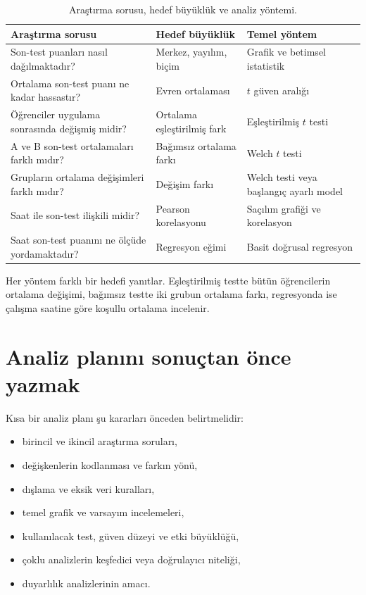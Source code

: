 \begin{table}[htbp]
\centering
\caption{Araştırma sorusu, hedef büyüklük ve analiz yöntemi.}
\begingroup\scriptsize
\begin{tabular}{@{}p{}p{}p{}@{}}
\toprule
Araştırma sorusu & Hedef büyüklük & Temel yöntem \\
\midrule
Son-test puanları nasıl dağılmaktadır? & Merkez, yayılım, biçim & Grafik ve betimsel istatistik \\
Ortalama son-test puanı ne kadar hassastır? & Evren ortalaması & $t$ güven aralığı \\
Öğrenciler uygulama sonrasında değişmiş midir? & Ortalama eşleştirilmiş fark & Eşleştirilmiş $t$ testi \\
A ve B son-test ortalamaları farklı mıdır? & Bağımsız ortalama farkı & Welch $t$ testi \\
Grupların ortalama değişimleri farklı mıdır? & Değişim farkı & Welch testi veya başlangıç ayarlı model \\
Saat ile son-test ilişkili midir? & Pearson korelasyonu & Saçılım grafiği ve korelasyon \\
Saat son-test puanını ne ölçüde yordamaktadır? & Regresyon eğimi & Basit doğrusal regresyon \\
\bottomrule
\end{tabular}
\endgroup
\end{table}

Her yöntem farklı bir hedefi yanıtlar. Eşleştirilmiş testte bütün öğrencilerin
ortalama değişimi, bağımsız testte iki grubun ortalama farkı, regresyonda ise
çalışma saatine göre koşullu ortalama incelenir.

\section{Analiz planını sonuçtan önce yazmak}

Kısa bir analiz planı şu kararları önceden belirtmelidir:

\begin{itemize}
  \item birincil ve ikincil araştırma soruları,
  \item değişkenlerin kodlanması ve farkın yönü,
  \item dışlama ve eksik veri kuralları,
  \item temel grafik ve varsayım incelemeleri,
  \item kullanılacak test, güven düzeyi ve etki büyüklüğü,
  \item çoklu analizlerin keşfedici veya doğrulayıcı niteliği,
  \item duyarlılık analizlerinin amacı.
\end{itemize}

